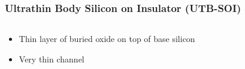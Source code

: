 \documentclass{beamer}
\begin{document}
\begin{frame}\frametitle{Ultrathin Body Silicon on Insulator (UTB-SOI)} 
\begin{columns}
\begin{column}{5cm}
\begin{itemize}
\item<1-> Thin layer of buried oxide on top of base silicon

\item<2-> Very thin channel


\end{itemize}
\end{column}
\begin{column}{7cm}
\begin{center}
\begin{overprint}



\end{overprint}
\end{center}
\end{column}
\end{columns}
\end{frame}
\end{document}
